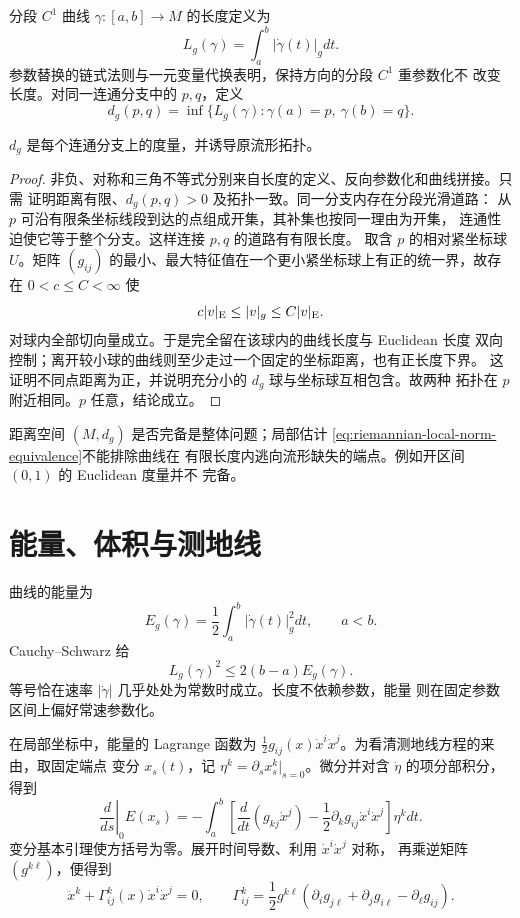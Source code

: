 分段 $C^1$ 曲线 $\gamma:[a,b]\to M$ 的长度定义为
\[
 L_g(\gamma)=\int_a^b|\dot\gamma(t)|_gdt.
\]
参数替换的链式法则与一元变量代换表明，保持方向的分段 $C^1$ 重参数化不
改变长度。对同一连通分支中的 $p,q$，定义
\[
 d_g(p,q)=\inf\{L_g(\gamma):\gamma(a)=p,\ \gamma(b)=q\}.
\]

\begin{theorem}\label{thm:riemannian-distance-topology}
$d_g$ 是每个连通分支上的度量，并诱导原流形拓扑。
\end{theorem}
\begin{proof}
非负、对称和三角不等式分别来自长度的定义、反向参数化和曲线拼接。只需
证明距离有限、$d_g(p,q)>0$ 及拓扑一致。同一分支内存在分段光滑道路：
从 $p$ 可沿有限条坐标线段到达的点组成开集，其补集也按同一理由为开集，
连通性迫使它等于整个分支。这样连接 $p,q$ 的道路有有限长度。
取含 $p$ 的相对紧坐标球 $U$。矩阵
$(g_{ij})$ 的最小、最大特征值在一个更小紧坐标球上有正的统一界，故存在
$0<c\le C<\infty$ 使
\begin{equation}\label{eq:riemannian-local-norm-equivalence}
 c|v|_{\rm E}\le |v|_g\le C|v|_{\rm E}.
\end{equation}
对球内全部切向量成立。于是完全留在该球内的曲线长度与 Euclidean 长度
双向控制；离开较小球的曲线则至少走过一个固定的坐标距离，也有正长度下界。
这证明不同点距离为正，并说明充分小的 $d_g$ 球与坐标球互相包含。故两种
拓扑在 $p$ 附近相同。$p$ 任意，结论成立。
\end{proof}

距离空间 $(M,d_g)$ 是否完备是整体问题；局部估计
\eqref{eq:riemannian-local-norm-equivalence}不能排除曲线在
有限长度内逃向流形缺失的端点。例如开区间 $(0,1)$ 的 Euclidean 度量并不
完备。

\section{能量、体积与测地线}

曲线的能量为
\[
 E_g(\gamma)=\frac12\int_a^b|\dot\gamma(t)|_g^2dt,\qquad a<b.
\]
Cauchy--Schwarz 给
\begin{equation}\label{eq:riemannian-length-energy}
 L_g(\gamma)^2\le2(b-a)E_g(\gamma).
\end{equation}
等号恰在速率 $|\dot\gamma|$ 几乎处处为常数时成立。长度不依赖参数，能量
则在固定参数区间上偏好常速参数化。

在局部坐标中，能量的 Lagrange 函数为
$\tfrac12g_{ij}(x)\dot x^i\dot x^j$。为看清测地线方程的来由，取固定端点
变分 $x_s(t)$，记 $\eta^k=\partial_sx_s^k|_{s=0}$。微分并对含
$\dot\eta$ 的项分部积分，得到
\[
 \left.\frac d{ds}\right|_{0}E(x_s)
 =-\int_a^b
 \left[\frac d{dt}(g_{kj}\dot x^j)
       -\frac12\partial_k g_{ij}\dot x^i\dot x^j\right]\eta^kdt.
\]
变分基本引理使方括号为零。展开时间导数、利用 $\dot x^i\dot x^j$ 对称，
再乘逆矩阵 $(g^{k\ell})$，便得到
\begin{equation}\label{eq:riemannian-geodesic-coordinate}
 \ddot x^k+\Gamma^k_{ij}(x)\dot x^i\dot x^j=0,
 \qquad
 \Gamma^k_{ij}=\frac12g^{k\ell}
 (\partial_i g_{j\ell}+\partial_jg_{i\ell}-\partial_\ell g_{ij}).
\end{equation}

